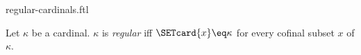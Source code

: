 \documentclass{stex}
\begin{document}
\begin{smodule}{regular-cardinals.ftl}

\begin{definition}[forthel,id=SET_THEORY_06_6532641205487950]
  Let $\kappa$ be a cardinal.
  $\kappa$ is \emph{regular} iff $\SETcard{x} \eq \kappa$ for every cofinal subset $x$ of $\kappa$.
\end{definition}
\end{smodule}
\end{document}
